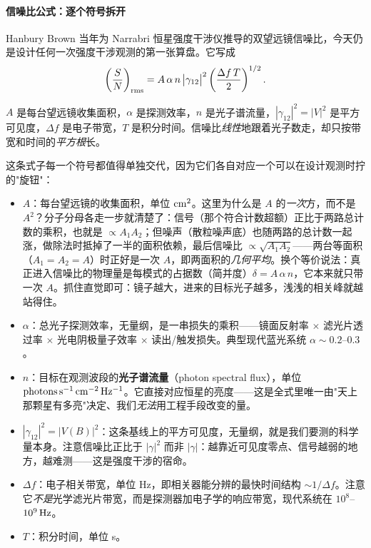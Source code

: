 \paragraph{信噪比公式：逐个符号拆开}
\label{sec:e11-snr-formula}

Hanbury Brown 当年为 Narrabri 恒星强度干涉仪推导的双望远镜信噪比，今天仍是设计任何一次强度干涉观测的第一张算盘。它写成
\begin{equation}
  \left(\frac{S}{N}\right)_{\rm rms}
  = A\,\alpha\,n\,\big|\gamma_{12}\big|^2
  \left(\frac{\Delta f\,T}{2}\right)^{1/2}.
  \label{eq:e11-snr}
\end{equation}
\begin{formulaexplain}
\(A\) 是每台望远镜收集面积，\(\alpha\) 是探测效率，\(n\) 是光子谱流量，\(|\gamma_{12}|^2=|V|^2\) 是平方可见度，\(\Delta f\) 是电子带宽，\(T\) 是积分时间。信噪比\emph{线性}地跟着光子数走，却只按带宽和时间的\emph{平方根}长。
\end{formulaexplain}

这条式子每一个符号都值得单独交代，因为它们各自对应一个可以在设计观测时拧的"旋钮"：

\begin{itemize}
  \item \(A\)：每台望远镜的收集面积，单位 \({\rm cm^2}\)。这里为什么是 \(A\) 的\emph{一次}方，而不是 \(A^2\)？分子分母各走一步就清楚了：信号（那个符合计数超额）正比于两路总计数的乘积，也就是 \(\propto A_1 A_2\)；但噪声（散粒噪声底）也随两路的总计数一起涨，做除法时抵掉了一半的面积依赖，最后信噪比 \(\propto\sqrt{A_1 A_2}\)——两台等面积（\(A_1=A_2=A\)）时正好是一次 \(A\)，即两面积的\emph{几何平均}。换个等价说法：真正进入信噪比的物理量是每模式的占据数（简并度）\(\delta=A\,\alpha\,n\)，它本来就只带一次 \(A\)。抓住直觉即可：镜子越大，进来的目标光子越多，浅浅的相关峰就越站得住。
  \item \(\alpha\)：总光子探测效率，无量纲，是一串损失的乘积——镜面反射率 \(\times\) 滤光片透过率 \(\times\) 光电阴极量子效率 \(\times\) 读出/触发损失。典型现代蓝光系统 \(\alpha\sim0.2\)–\(0.3\)。
  \item \(n\)：目标在观测波段的\textbf{光子谱流量}（photon spectral flux），单位 \({\rm photons\,s^{-1}\,cm^{-2}\,Hz^{-1}}\)。它直接对应恒星的亮度——这是全式里唯一由"天上那颗星有多亮"决定、我们\emph{无法}用工程手段改变的量。
  \item \(|\gamma_{12}|^2=|V(B)|^2\)：这条基线上的平方可见度，无量纲，就是我们要测的科学量本身。注意信噪比正比于 \(|\gamma|^2\) 而非 \(|\gamma|\)：越靠近可见度零点、信号越弱的地方，越难测——这是强度干涉的宿命。
  \item \(\Delta f\)：电子相关带宽，单位 Hz，即相关器能分辨的最快时间结构 \(\sim1/\Delta f\)。注意它\emph{不是}光学滤光片带宽，而是探测器加电子学的响应带宽，现代系统在 \(10^8\)–\(10^9\,{\rm Hz}\)。
  \item \(T\)：积分时间，单位 s。
\end{itemize}

